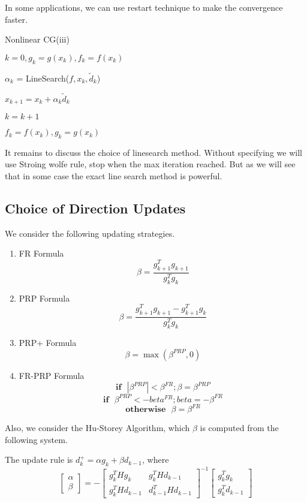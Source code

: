 \documentclass{article}
\begin{document}
In some applications, we can use restart technique to make the convergence faster. 
\begin{algorithm}[H]
	\caption{Nonlinear CG(iii)}
	$k=0, g_k = g(x_k), f_k = f(x_k)$\\
	
	{
		
		$\alpha_k$ = LineSearch($f, x_k, \tilde d_k$)
		
		$x_{k+1} = x_k + \alpha_k \tilde d_k$
		
		
		$k =k+1$
		
		$f_k = f(x_k), g_k = g(x_k)$
	}
\end{algorithm}

It remains to discuss the choice of linesearch method. Without specifying we will use Stroing wolfe rule, stop when the max iteration reached. But as we will see that in some case the exact line search method is powerful.

\subsection{Choice of Direction Updates}
We consider the following updating strategies.

\begin{enumerate}
	\item FR Formula $$\beta = \frac{g_{k+1}^Tg_{k+1}}{g_k^Tg_k}$$
	\item PRP Formula 
	$$\beta = \frac{g_{k+1}^Tg_{k+1} - g_{k+1}^Tg_k}{g_k^Tg_k}$$
	\item PRP+ Formula 
	$$\beta = \max(\beta^{PRP},0)$$
	\item FR-PRP Formula
	$$ \textbf{if~~} |\beta^{PRP}| < \beta^{FR}; \beta = \beta^{PRP}$$
	$$\textbf{if~~} \beta^{PRP} < - beta^{FR}; beta = - \beta^{FR}$$
$$	\textbf{otherwise~~} \beta = \beta^{FR}$$
\end{enumerate}

Also, we consider the Hu-Storey Algorithm, which $\beta$ is computed from the following system.

The update rule is $d^+_k = \alpha g_k + \beta d_{k-1}$, where
$$\begin{bmatrix}
\alpha \\ \beta
\end{bmatrix} = - \begin{bmatrix}
g_k^THg_k& g_k^THd_{k-1} \\ 
g_k^THd_{k-1}& d_{k-1}^THd_{k-1}
\end{bmatrix}^{-1} 
\begin{bmatrix}
g_k^Tg_k \\ g_k^Td_{k-1}
\end{bmatrix}
$$
\end{document}

